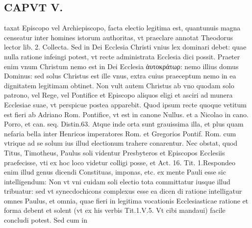 \documentclass{article}
\begin{document}
\begin{pages}
\section*{CAPVT  V. }
\marginpar{[ p.347 ]}\pstart taxat Episcopo vel Archiepiscopo, facta electio legitima est, quantunuis magna censeatur inter homines istorum authoritas, vt praeclare annotat Theodorus lector lib. 2. Collecta. Sed in Dei Ecclesia Christi vnius lex dominari debet: quae nulla ratione infeingi potest, vt recte administrata Ecclesia dici possit. Praeter enim vnum Christum nemo est in Dei Ecclesia ἀυτοκράτωρ: nemo illius domus Dominus: sed solus Christus est ille vnus, extra cuius praeceptum nemo in ea dignitatem legitimam obtinet. Non vult autem Christus ab vno quodam solo patrono, vel Rege, vel Pontifice et Episcopo aliquos eligi et asciri ad munera Ecclesiae suae, vt perspicue postea apparebit. Quod ipsum recte quoque vetitum est fieri ab Adriano Rom. Pontifice, vt est in canone Nullus. et a Nicolao in cano. Porro, et can. seq. Distin.63. Atque inde orta sunt grauissima illa, et plus quam nefaria bella inter Henricos imperatores Rom. et Gregorios Pontif. Rom. cum vtrique ad se solum ius illud electionum trahere conarentur. Nec obstat, quod Titus, Timotheus, Paulus soli videntur Presbyteros et Episcopos Ecclesiis praefecisse, vti ex hoc loco videtur colligi posse, et Act. 16. Tit. 1.Respondeo enim illud genus dicendi Constituas, imponas, etc. ex mente Pauli esse sic intelligendum: Non vt vni cuidam soli electio tota committatur iusque illud tribuatur: sed vt synecdochicons complexus esse ea dicen di ratione intelligatur omnes Paulus, et omnia, quae fieri in legitima vocationis Ecclesiasticae ratione et forma debent et solent (vt ex his verbis Tit.1.V.5. Vt cibi mandaui) facile concludi potest. Sed cum in  \pend

\end{pages}
\end{document}
